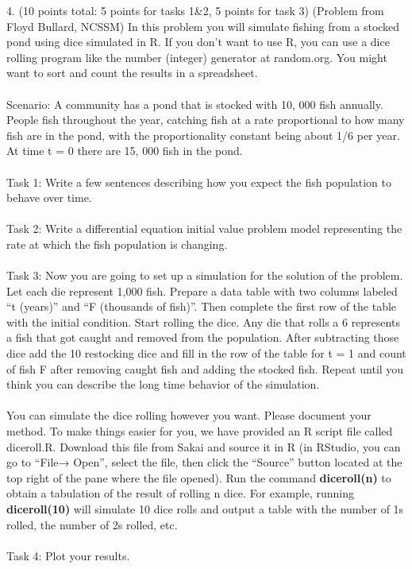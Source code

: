\documentclass[12pt,letterpaper]{hmcpset}
\begin{document}
\begin{problem}
4. (10 points total: 5 points for tasks 1&2, 5 points for task 3) (Problem from Floyd Bullard,
NCSSM) In this problem you will simulate fishing from a stocked pond using dice simulated
in R. If you don’t want to use R, you can use a dice rolling program like the number (integer)
generator at random.org. You might want to sort and count the results in a spreadsheet.\\\\
Scenario: A community has a pond that is stocked with 10, 000 fish annually. People fish
throughout the year, catching fish at a rate proportional to how many fish are in the pond,
with the proportionality constant being about 1/6 per year. At time t = 0 there are 15, 000
fish in the pond.\\\\
Task 1: Write a few sentences describing how you expect the fish population to behave over
time.\\\\
Task 2: Write a differential equation initial value problem model representing the rate at
which the fish population is changing.\\\\
Task 3: Now you are going to set up a simulation for the solution of the problem. Let each
die represent 1,000 fish. Prepare a data table with two columns labeled “t (years)” and “F
(thousands of fish)”. Then complete the first row of the table with the initial condition. Start
rolling the dice. Any die that rolls a 6 represents a fish that got caught and removed from
the population. After subtracting those dice add the 10 restocking dice and fill in the row
of the table for t = 1 and count of fish F after removing caught fish and adding the stocked
fish. Repeat until you think you can describe the long time behavior of the simulation.\\\\
You can simulate the dice rolling however you want. Please document your method. To
make things easier for you, we have provided an R script file called diceroll.R. Download
this file from Sakai and source it in R (in RStudio, you can go to “File→ Open”, select
the file, then click the “Source” button located at the top right of the pane where the file
opened). Run the command \textbf{diceroll(n)} to obtain a tabulation of the result of rolling n
dice. For example, running \textbf{diceroll(10)} will simulate 10 dice rolls and output a table with
the number of 1s rolled, the number of 2s rolled, etc.\\\\
Task 4: Plot your results.\\
\end{problem}
\newpage
\end{document}

